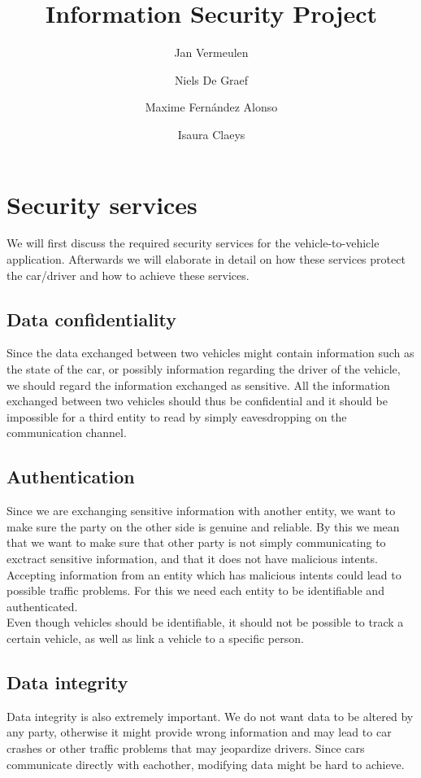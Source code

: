 \documentclass[a4paper, 11pt]{article}
\title{Information Security Project}
\author{
Jan Vermeulen \and
Niels De Graef \and
Maxime Fern\'andez Alonso \and
Isaura Claeys
}
\begin{document}
\maketitle
\tableofcontents

\newpage

\section{Security services}
We will first discuss the required security services for the
vehicle-to-vehicle application. Afterwards we will elaborate in detail on
how these services protect the car/driver and how to achieve these
services.

\subsection{Data confidentiality}
Since the data exchanged between two vehicles might contain information such as
the state of the car, or possibly information regarding the driver of the
vehicle, we should regard the information exchanged as sensitive.
All the information exchanged between two vehicles should thus be confidential
and it should be impossible for a third entity to read by simply eavesdropping
on the communication channel.

\subsection{Authentication}
Since we are exchanging sensitive information with another entity, we want to
make sure the party on the other side is genuine and reliable. By this we mean
that we want to make sure that other party is not simply communicating to
exctract sensitive information, and that it does not have malicious intents.
Accepting information from an entity which has malicious intents could lead to
possible traffic problems. For this we need each entity to be identifiable and
authenticated. \\

Even though vehicles should be identifiable, it should not be possible
to track a certain vehicle, as well as link a vehicle to a specific
person.

\subsection{Data integrity}
Data integrity is also extremely important. We do not want data to be
altered by any party, otherwise it might provide wrong information and may
lead to car crashes or other traffic problems that may jeopardize drivers.
Since cars communicate directly with eachother, modifying data might be hard to
achieve. \\
\end{document}
